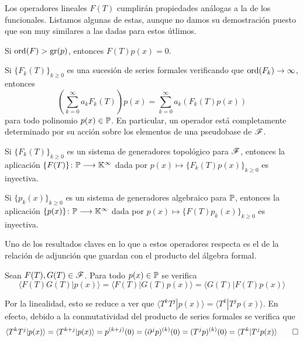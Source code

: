 Los operadores lineales $F(T)$ cumplirán propiedades análogas a la de los funcionales. Listamos algunas de estas, aunque no damos su demostración puesto que son muy similares a las dadas para estos útlimos.

\begin{proposicion}
    Si $\operatorname*{ord}(F) > \operatorname{gr}(p)$, entonces $F(T)p(x) = 0$.
\end{proposicion}

\begin{proposicion}
    Si $\{F_k(T)\}_{k \geq 0}$ es una sucesión de series formales verificando que $\operatorname*{ord}(F_k) \rightarrow \infty$, entonces
    \begin{equation*}
        \left( \sum_{k=0}^\infty a_kF_k(T) \right)p(x) = \sum_{k=0}^\infty a_k \left( F_k(T)p(x) \right)
    \end{equation*}
    para todo polinomio $p(x) \in \mathbb{P}$. En particular, un operador está completamente determinado por su acción sobre los elementos de una pseudobase de $\mathscr{F}$.
\end{proposicion}


\begin{proposicion}
    Si $\{ F_k(T) \}_{k \geq 0}$ es un sistema de generadores topológico para $\mathscr{F}$, entonces la aplicación $\{F(T)\} \colon  \mathbb{P} \longrightarrow \mathbb{K}^\infty$ dada por $p(x) \mapsto \{ F_k(T)p(x)\}_{k \geq 0}$ es inyectiva.
\end{proposicion}

\begin{proposicion}
    Si $\{ p_k(x) \}_{k \geq 0}$ es un sistema de generadores algebraico para $\mathbb{P}$, entonces la aplicación $\{p(x)\} \colon \mathbb{P} \longrightarrow \mathbb{K}^\infty$ dada por $p(x) \mapsto \{ F(T)p_k(x)\}_{k \geq 0}$ es inyectiva.
\end{proposicion}

Uno de los resultados claves en lo que a estos operadores respecta es el de la relación de adjunción que guardan con el producto del álgebra formal.
\begin{teorema}[de adjunción]\label{adjuncion serie operador y multiplicacion}
    Sean $F(T), G(T) \in \mathscr{F}$. Para todo $p(x) \in \mathbb{P}$ se verifica
    \begin{equation*}
        \langle F(T)G(T) | p(x) \rangle = \langle F(T) | G(T)p(x) \rangle = \langle G(T) | F(T)p(x) \rangle
    \end{equation*}
\end{teorema}

\begin{demo}
    Por la linealidad, esto se reduce a ver que $\langle T^k T^j | p(x) \rangle = \langle T^k | T^j p(x) \rangle$. En efecto, debido a la conmutatividad del producto de series formales se verifica que
    \begin{equation*}
        \langle T^k T^j | p(x) \rangle  = \langle T^{k+j} | p(x) \rangle = p^{(k+j)}(0) = (\partial^j p)^{(k)}(0) = (T^j p)^{(k)}(0) = \langle T^k | T^j p(x) \rangle \qedhere
    \end{equation*}
\end{demo}

